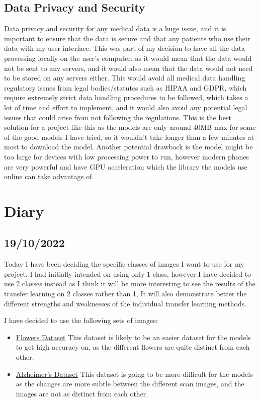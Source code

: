 \documentclass[]{final_report}
\begin{document}
\section{Data Privacy and Security}
Data privacy and security for any medical data is a huge issue, and it is important to ensure that the data is secure and that any patients who use their data with my user interface. This was part of my decision to have all the data processing locally on the user's computer, as it would mean that the data would not be sent to any servers, and it would also mean that the data would not need to be stored on any servers either. This would avoid all medical data handling regulatory issues from legal bodies/statutes such as HIPAA and GDPR, which require extremely strict data handling procedures to be followed, which takes a lot of time and effort to implement, and it would also avoid any potential legal issues that could arise from not following the regulations. This is the best solution for a project like this as the models are only around 40MB max for some of the good models I have tried, so it wouldn't take longer than a few minutes at most to download the model. Another potential drawback is the model might be too large for devices with low processing power to run, however modern phones are very powerful and have GPU acceleration which the library the models use online can take advantage of.

\chapter{Diary}

\section*{19/10/2022}

Today I have been deciding the specific classes of images I want to use for my project.
I had initially intended on using only 1 class, however I have decided to use 2 classes instead as I think it will be more interesting to see the results of the transfer learning on 2 classes rather than 1,
It will also demonstrate better the different strengths and weaknesses of the individual transfer learning methods.

I have decided to use the following sets of images:

\begin{itemize}
  \item \href{https://storage.googleapis.com/download.tensorflow.org/example_images/flower_photos.tgz}{Flowers Dataset}
        This dataset is likely to be an easier dataset for the models to get high accuracy on, as the different flowers are quite distinct from each other.
  \item  \href{https://www.kaggle.com/datasets/uraninjo/augmented-alzheimer-mri-dataset}{Alzheimer's Dataset}
        This dataset is going to be more difficult for the models as the changes are more subtle between the different scan images, and the images are not as distinct from each other.
\end{itemize}
\end{document}
